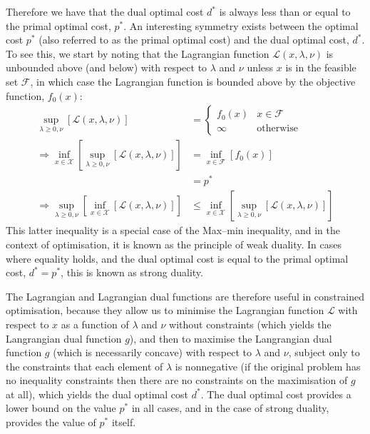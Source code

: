 Therefore we have that the dual optimal cost $d^*$ is always less than or equal to the primal optimal cost, $p^*$. An interesting symmetry exists between the optimal cost $p^*$ (also referred to as the primal optimal cost) and the dual optimal cost, $d^*$. To see this, we start by noting that the Lagrangian function $\mathcal{L}(x, \lambda, \nu)$ is unbounded above (and below) with respect to $\lambda$ and $\nu $ unless $x$ is in the feasible set $\mathcal{F}$, in which case the Lagrangian function is bounded above by the objective function, $f_0(x)$:
\begin{align}
    \underset{\lambda \ge 0, \nu}{\sup}\left[ \mathcal{L}(x, \lambda, \nu) \right] &= \begin{cases}
        f_0(x) & x \in \mathcal{F} \\
        \infty & \text{otherwise}
    \end{cases} \\
    \Rightarrow \underset{x\in\mathcal{X}}{\inf}\left[\underset{\lambda \ge 0, \nu}{\sup}\left[\mathcal{L}(x, \lambda, \nu)\right]\right] &= \underset{x\in\mathcal{F}}{\inf}\left[f_0(x)\right] \\
    &= p^* \\
    \Rightarrow \underset{\lambda \ge 0, \nu}{\sup}\left[\underset{x\in\mathcal{X}}{\inf}\left[\mathcal{L}(x, \lambda, \nu)\right]\right] &\le \underset{x\in\mathcal{X}}{\inf}\left[\underset{\lambda \ge 0, \nu}{\sup}\left[\mathcal{L}(x, \lambda, \nu)\right]\right]
\end{align}
This latter inequality is a special case of the Max–min inequality, and in the context of optimisation, it is known as the principle of weak duality. In cases where equality holds, and the dual optimal cost is equal to the primal optimal cost, $d^* = p^*$, this is known as strong duality.

The Lagrangian and Lagrangian dual functions are therefore useful in constrained optimisation, because they allow us to minimise the Lagrangian function $\mathcal{L}$ with respect to $x$ as a function of $\lambda$ and $\nu$ without constraints (which yields the Langrangian dual function $g$), and then to maximise the Langrangian dual function $g$ (which is necessarily concave) with respect to $\lambda$ and $\nu$, subject only to the constraints that each element of $\lambda$ is nonnegative (if the original problem has no inequality constraints then there are no constraints on the maximisation of $g$ at all), which yields the dual optimal cost $d^*$. The dual optimal cost provides a lower bound on the value $p^*$ in all cases, and in the case of strong duality, provides the value of $p^*$ itself.
